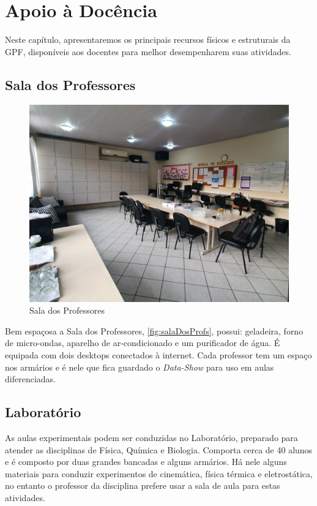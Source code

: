 \chapter{Apoio à Docência}
\thispagestyle{empty}
\label{cap: apoioDocencia}
Neste capítulo, apresentaremos os principais recursos físicos e estruturais da \ac{GPF}, disponíveis aos docentes para melhor desempenharem suas atividades.

\section{Sala dos Professores}
\setlength\intextsep{0pt}
\begin{figure}
    \centering
    \includegraphics[width=.45\textwidth]{03-elementos/03.2_textual/03.2.1_fig/sala-de-profs01.jpg}
    \caption{Sala dos Professores}
    \label{fig:salaDosProfs}
\end{figure}
Bem espaçosa a Sala dos Professores, \autoref{fig:salaDosProfs}, possui: geladeira, forno de micro-ondas, aparelho de ar-condicionado e um purificador de água. É equipada com dois desktops conectados à internet. Cada professor tem um espaço nos armários e é nele que fica guardado o \emph{Data-Show} para uso em aulas diferenciadas.

\section{Laboratório}
As aulas experimentais podem ser conduzidas no Laboratório, preparado para atender as disciplinas de Física, Química e Biologia. Comporta cerca de 40 alunos e é composto por duas grandes bancadas e alguns armários. Há nele alguns materiais para conduzir experimentos de cinemática, física térmica e eletrostática, no entanto o professor da disciplina prefere usar a sala de aula para estas atividades.

